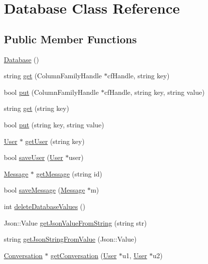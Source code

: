 \hypertarget{classDatabase}{\section{Database Class Reference}
\label{classDatabase}
}
\subsection*{Public Member Functions}
\begin{DoxyCompactItemize}
\item 
\hyperlink{classDatabase_a4703c80e6969d33565ea340f768fdadf}{Database} ()
\item 
string \hyperlink{classDatabase_aaeca6b96023c0a805a0d4aef73e80bc5}{get} (Column\-Family\-Handle $\ast$cf\-Handle, string key)
\item 
bool \hyperlink{classDatabase_a03b8b9b0fc9661a8f4cdf095486b1efa}{put} (Column\-Family\-Handle $\ast$cf\-Handle, string key, string value)
\item 
string \hyperlink{classDatabase_aff1c4f3eeb87791ba42fab6e0dcb6548}{get} (string key)
\item 
bool \hyperlink{classDatabase_a039739d8784bd2d050a5132c7b42c289}{put} (string key, string value)
\item 
\hyperlink{classUser}{User} $\ast$ \hyperlink{classDatabase_ab5c56d4cc97bc85dc533ba5f8343fcb1}{get\-User} (string key)
\item 
bool \hyperlink{classDatabase_a773b34557b1875cfa887597a4e4f5c8a}{save\-User} (\hyperlink{classUser}{User} $\ast$user)
\item 
\hyperlink{classMessage}{Message} $\ast$ \hyperlink{classDatabase_aed6066647f099ed6d5ec78f761024f62}{get\-Message} (string id)
\item 
bool \hyperlink{classDatabase_aedececaa0011428707df6792296d9e13}{save\-Message} (\hyperlink{classMessage}{Message} $\ast$m)
\item 
int \hyperlink{classDatabase_a9601ee85341d98215b7e832a6659f39c}{delete\-Database\-Values} ()
\item 
Json\-::\-Value \hyperlink{classDatabase_a883ced43e68ea29073518d6d788f4188}{get\-Json\-Value\-From\-String} (string str)
\item 
string \hyperlink{classDatabase_a17f4296cbce40609301374d8fcbbb1bf}{get\-Json\-String\-From\-Value} (Json\-::\-Value)
\item 
\hyperlink{classConversation}{Conversation} $\ast$ \hyperlink{classDatabase_a6db0563f834b2956026a2eaad45152ef}{get\-Conversation} (\hyperlink{classUser}{User} $\ast$u1, \hyperlink{classUser}{User} $\ast$u2)

\end{DoxyCompactItemize}
